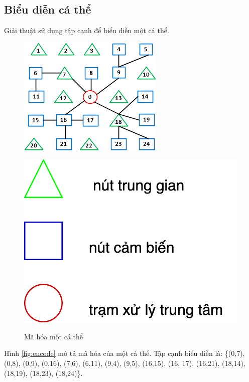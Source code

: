 \documentclass{hust}
\begin{document}
\subsection{Biểu diễn cá thể}
Giải thuật sử dụng tập cạnh để biểu diễn một cá thể.

\begin{figure}[H]
	\begin{minipage}{0.8\textwidth}
		\centering
		\includegraphics[width=0.6\linewidth]{images/graph}
		\caption{Mã hóa một cá thể}\label{fig:encode}
	\end{minipage}\hfill
	\begin{minipage}{0.2\textwidth}
		\centering
		\includegraphics[width=1.2\linewidth]{images/diagram-note.png}
		\label{fig:note}
	\end{minipage}
\end{figure}

Hình \ref{fig:encode} mô tả mã hóa của một cá thể. Tập cạnh biểu diễn là: \{(0,7), (0,8), (0,9), (0,16), (7,6), (6,11), (9,4), (9,5), (16,15), (16, 17), (16,21), (18,14), (18,19), (18,23), (18,24)\}.
\end{document}
